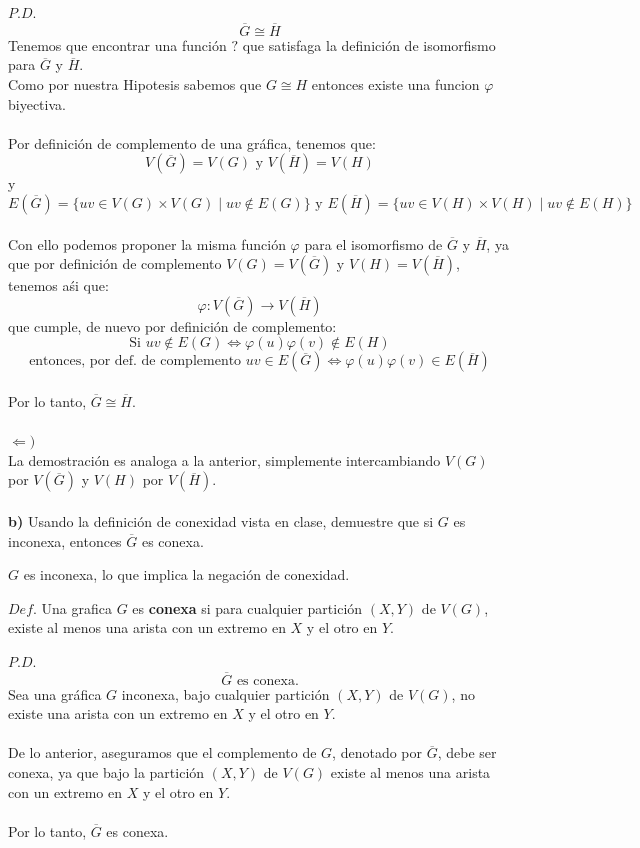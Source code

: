 \documentclass[12pt]{article}
\begin{document}
$P.D$.
\[\overline{G} \cong \overline{H}\]
Tenemos que encontrar una función $?$ que satisfaga la definición de isomorfismo para $\overline{G}$ y $\overline{H}$.\\
Como por nuestra Hipotesis sabemos que $G \cong H$ entonces existe una funcion $\varphi$ biyectiva.\\
\\
Por definición de complemento de una gráfica, tenemos que:
\[V(\overline{G}) = V(G) \text{ y } V(\overline{H}) = V(H)\] 
y
\[E(\overline{G}) = \{ uv \in V(G) \times V(G) \mid uv \notin E(G)\} \text{ y } E(\overline{H}) = \{ uv \in V(H) \times V(H) \mid uv \notin E(H)\}\]
\\
Con ello podemos proponer la misma función $\varphi$ para el isomorfismo de $\overline{G}$ y $\overline{H}$, ya que por definición de complemento $V(G) = V(\overline{G})$ y $V(H) = V(\overline{H})$,
tenemos aśi que:
\[\varphi: V(\overline{G}) \rightarrow V(\overline{H})\]
que cumple, de nuevo por definición de complemento:
\[\text{Si } uv \notin E(G) \Longleftrightarrow \varphi(u)\varphi(v) \notin E(H) \]
\[\text{entonces, por def. de complemento } uv \in E(\overline{G}) \Longleftrightarrow \varphi(u)\varphi(v) \in E(\overline{H})\]
\\
Por lo tanto, $\overline{G} \cong \overline{H}$. 
\\
\\
$\Leftarrow)$\\
La demostración es analoga a la anterior, simplemente intercambiando $V(G)$ por $V(\overline{G})$ y $V(H)$ por $V(\overline{H})$.
\\
\\
\textbf{b)} Usando la definición de conexidad vista en clase, demuestre que si $G$ es inconexa,
entonces $\overline{G}$ es conexa.
\begin{tcolorbox}[title=\textbf{Hipotesis}, colback=red!15!white, colframe=black!]
    $G$ es inconexa, lo que implica la negación de conexidad.
\end{tcolorbox}
\begin{tcolorbox}[title=\textbf{Definiciones}, colback=blue!15!white, colframe=black!]
    $Def$. Una grafica $G$ es \textbf{conexa} si para cualquier partición $(X,Y)$ de $V(G)$, existe al menos una arista con un extremo
    en $X$ y el otro en $Y$.
\end{tcolorbox}
$P.D.$ \[\overline{G} \text{ es conexa.}\]
Sea una gráfica $G$ inconexa, bajo cualquier partición $(X,Y)$ de $V(G)$, no existe una arista
con un extremo en $X$ y el otro en $Y$.\\
\\
De lo anterior, aseguramos que el complemento de $G$, denotado por $\overline{G}$, debe ser conexa, ya que bajo la partición $(X,Y)$ de $V(G)$
existe al menos una arista con un extremo en $X$ y el otro en $Y$.\\
\\
Por lo tanto, $\overline{G}$ es conexa.
\vspace{1cm}
\end{document}
